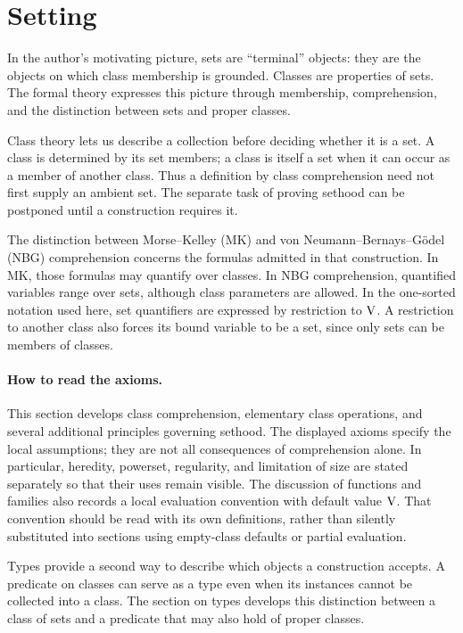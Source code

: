 \def\topic{}

\section{Setting}
In the author's motivating picture, sets are ``terminal'' objects: they
are the objects on which class membership is grounded. Classes are properties of sets.
The formal theory expresses this picture through membership, comprehension,
and the distinction between sets and proper classes.

Class theory lets us describe a collection before deciding whether it is a
set. A class is determined by its set members; a class is itself a set when
it can occur as a member of another class. Thus a definition by class
comprehension need not first supply an ambient set. The separate task of
proving sethood can be postponed until a construction requires it.

The distinction between Morse--Kelley (MK) and von Neumann--Bernays--G\"odel
(NBG) comprehension concerns the formulas admitted in that construction.
In MK, those formulas may quantify over classes. In NBG comprehension,
quantified variables range over sets, although class parameters are allowed.
In the one-sorted notation used here, set quantifiers are expressed by
restriction to $\mathrm{V}$. A restriction to another class also forces its bound
variable to be a set, since only sets can be members of classes.

\paragraph{How to read the axioms.}
This section develops class comprehension, elementary class operations,
and several additional principles governing sethood. The displayed axioms
specify the local assumptions; they are not all consequences of
comprehension alone. In particular, heredity, powerset, regularity, and
limitation of size are stated separately so that their uses remain visible.
The discussion of functions and families also records a local evaluation
convention with default value $\mathrm{V}$. That convention should be read with
its own definitions, rather than silently substituted into sections using
empty-class defaults or partial evaluation.

Types provide a second way to describe which objects a construction accepts.
A predicate on classes can serve as a type even when its instances cannot
be collected into a class. The section on types develops this distinction
between a class of sets and a predicate that may also hold of proper classes.


